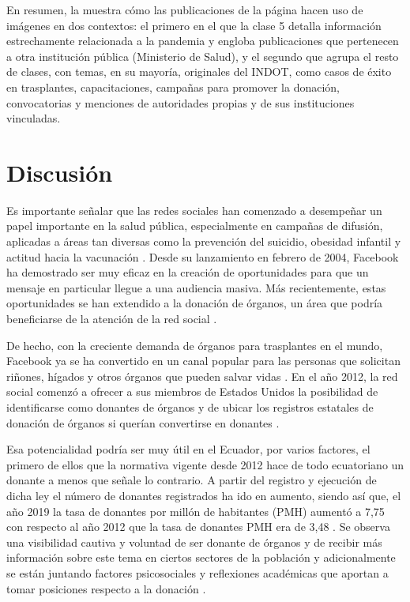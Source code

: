 \documentclass[spanish]{textolivre}
\begin{document}
En resumen, la  muestra cómo las publicaciones de la página hacen uso de imágenes en dos contextos: el primero en el que la clase 5 detalla información estrechamente relacionada a la pandemia y engloba publicaciones que pertenecen a otra institución pública (Ministerio de Salud), y el segundo que agrupa el resto de clases, con temas, en su mayoría, originales del INDOT, como casos de éxito en trasplantes, capacitaciones, campañas para promover la donación, convocatorias y menciones de autoridades propias y de sus instituciones vinculadas.

\section{Discusión}\label{sec-discusion}

Es importante señalar que las redes sociales han comenzado a desempeñar un papel importante en la salud pública, especialmente en campañas de difusión, aplicadas a áreas tan diversas como la prevención del suicidio, obesidad infantil y actitud hacia la vacunación \cite{luxton2012, salathe2011, vandewater2011}. Desde su lanzamiento en febrero de 2004, Facebook ha demostrado ser muy eficaz en la creación de oportunidades para que un mensaje en particular llegue a una audiencia masiva. Más recientemente, estas oportunidades se han extendido a la donación de órganos, un área que podría beneficiarse de la atención de la red social \cite{cameronetal2013, greenemeier2012}.

De hecho, con la creciente demanda de órganos para trasplantes en el mundo, Facebook ya se ha convertido en un canal popular para las personas que solicitan riñones, hígados y otros órganos que pueden salvar vidas \cite{cameron2015, cameronetal2013}. En el año 2012, la red social comenzó a ofrecer a sus miembros de Estados Unidos la posibilidad de identificarse como donantes de órganos y de ubicar los registros estatales de donación de órganos si querían convertirse en donantes \cite{greenemeier2012}.

Esa potencialidad podría ser muy útil en el Ecuador, por varios factores, el primero de ellos que la normativa vigente desde 2012 hace de todo ecuatoriano un donante a menos que señale lo contrario. A partir del registro y ejecución de dicha ley el número de donantes registrados ha ido en aumento, siendo así que, el año 2019 la tasa de donantes por millón de habitantes (PMH) aumentó a 7,75 con respecto al año 2012 que la tasa de donantes PMH era de 3,48 \cite{indot2011}. Se observa una visibilidad cautiva y voluntad de ser donante de órganos y de recibir más información sobre este tema en ciertos sectores de la población y adicionalmente se están juntando factores psicosociales y reflexiones académicas que aportan a tomar posiciones respecto a la donación \cite{dos_santos2020, dos_santos2019}. 
\end{document}
